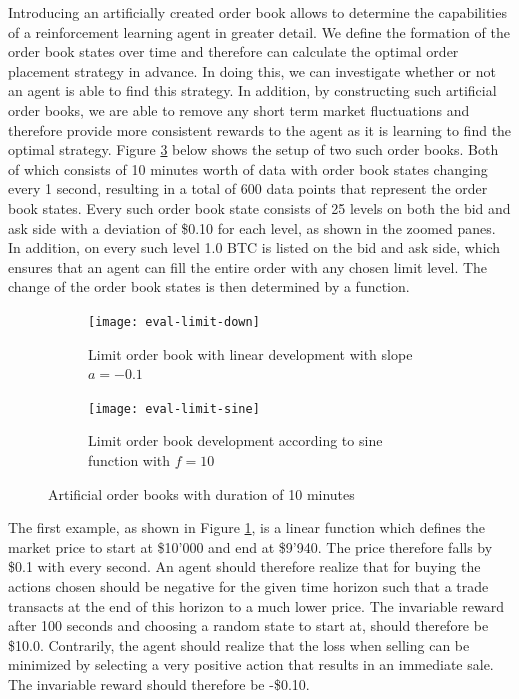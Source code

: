 Introducing an artificially created order book allows to determine the capabilities of a reinforcement learning agent in greater detail.
We define the formation of the order book states over time and therefore can calculate the optimal order placement strategy in advance.
In doing this, we can investigate whether or not an agent is able to find this strategy.
In addition, by constructing such artificial order books, we are able to remove any short term market fluctuations and therefore provide more consistent rewards to the agent as it is learning to find the optimal strategy.
Figure \ref{fig:eval-limit-artificial} below shows the setup of two such order books.
Both of which consists of 10 minutes worth of data with order book states changing every 1 second, resulting in a total of 600 data points that represent the order book states.
Every such order book state consists of 25 levels on both the bid and ask side with a deviation of \$0.10 for each level, as shown in the zoomed panes.
In addition, on every such level 1.0 BTC is listed on the bid and ask side, which ensures that an agent can fill the entire order with any chosen limit level.
The change of the order book states is then determined by a function.
\begin{figure}[H]
    \centering
    \begin{subfigure}[b]{0.45\textwidth}
        \texttt{[image: eval-limit-down]}
        \caption{Limit order book with linear development with slope $a=-0.1$}
        \label{fig:eval-limit-down}
    \end{subfigure}
    \begin{subfigure}[b]{0.45\textwidth}
        \texttt{[image: eval-limit-sine]}
        \caption{Limit order book development according to sine function with $f=10$}
        \label{fig:eval-limit-sine}
    \end{subfigure}
    \caption{Artificial order books with duration of 10 minutes}\label{fig:eval-limit-artificial}
\end{figure}

The first example, as shown in Figure \ref{fig:eval-limit-down}, is a linear function which defines the market price to start at \$10'000 and end at \$9'940.
The price therefore falls by \$0.1 with every second.
An agent should therefore realize that for buying the actions chosen should be negative for the given time horizon such that a trade transacts at the end of this horizon to a much lower price.
The invariable reward after 100 seconds and choosing a random state to start at, should therefore be \$10.0.
Contrarily, the agent should realize that the loss when selling can be minimized by selecting a very positive action that results in an immediate sale.
The invariable reward should therefore be -\$0.10.

